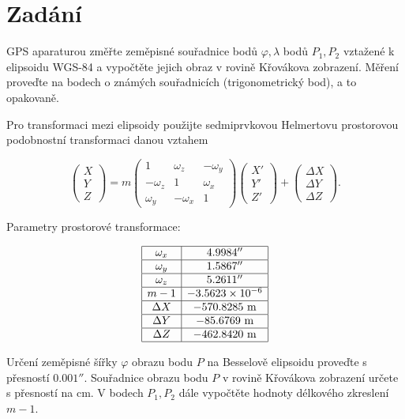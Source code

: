\section{Zadání}
GPS aparaturou změřte zeměpisné souřadnice bodů $\varphi, \lambda$ bodů $P_1, P_2$ vztažené k elipsoidu WGS-84 a vypočtěte jejich obraz v rovině Křovákova zobrazení. Měření proveďte na bodech o známých souřadnicích (trigonometrický bod), a to opakovaně.

Pro transformaci mezi elipsoidy použijte sedmiprvkovou Helmertovu prostorovou podobnostní transformaci danou vztahem

\[
\begin{pmatrix}
X \\
Y \\
Z
\end{pmatrix}
=
m
\begin{pmatrix}
1 & \omega_z & -\omega_y \\
-\omega_z & 1 & \omega_x \\
\omega_y & -\omega_x & 1
\end{pmatrix}
\begin{pmatrix}
X' \\
Y' \\
Z'
\end{pmatrix}
+
\begin{pmatrix}
\Delta X \\
\Delta Y \\
\Delta Z
\end{pmatrix}.
\]

Parametry prostorové transformace:

\[
\begin{array}{|c|c|}
\hline
\omega_x & 4.9984'' \\
\hline
\omega_y & 1.5867'' \\
\hline
\omega_z & 5.2611'' \\
\hline
m - 1 & -3.5623 \times 10^{-6} \\
\hline
\Delta X & -570.8285 \ \mathrm{m} \\
\hline
\Delta Y & -85.6769 \ \mathrm{m} \\
\hline
\Delta Z & -462.8420 \ \mathrm{m} \\
\hline
\end{array}
\]

Určení zeměpisné šířky $\varphi$ obrazu bodu $P$ na Besselově elipsoidu proveďte s přesností $0.001''$. Souřadnice obrazu bodu $P$ v rovině Křovákova zobrazení určete s přesností na cm. V bodech $P_1, P_2$ dále vypočtěte hodnoty délkového zkreslení $m - 1$.

